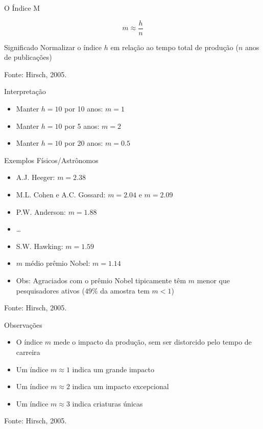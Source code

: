 \documentclass{beamer}
\begin{document}
\begin{frame}{O Índice M}
  \begin{definition}
    \begin{displaymath}
      m \approx \frac{h}{n}
    \end{displaymath}
  \end{definition}
  \begin{block}{Significado}
    Normalizar o índice $h$ em relação ao tempo total de produção ($n$ anos de publicações)
  \end{block}

\vfill
Fonte: Hirsch, 2005.
\end{frame}

\begin{frame}{Interpretação}
  \begin{itemize}
  \item Manter $h=10$ por 10 anos: $m=1$
  \item Manter $h=10$ por 5 anos: $m=2$
  \item Manter $h=10$ por 20 anos: $m=0.5$
  \end{itemize}
\end{frame}

\begin{frame}{Exemplos Físicos/Astrônomos}
  \begin{itemize}
  \item<1-> A.J. Heeger: $m=2.38$
  \item<1-> M.L. Cohen e A.C. Gossard: $m=2.04$ e $m=2.09$
  \item<1-> P.W. Anderson: $m=1.88$
  \item<1-> \ldots
  \item<1-> S.W. Hawking: $m=1.59$
  \item<2-> $m$ médio prêmio Nobel: $m=1.14$
  \item<3-> Obs: Agraciados com o prêmio Nobel tipicamente têm $m$ menor que pesquisadores ativos ($49\%$ da amostra tem $m<1$)
  \end{itemize}

\vfill
Fonte: Hirsch, 2005.
\end{frame}

\begin{frame}{Observações}
  \begin{itemize}
  \item O índice $m$ mede o impacto da produção, sem ser distorcido pelo tempo de carreira
  \item Um índice $m\approx 1$ indica um grande impacto
  \item Um índice $m\approx 2$ indica um impacto excepcional
  \item Um índice $m\approx 3$ indica criaturas únicas
  \end{itemize}

\vfill
Fonte: Hirsch, 2005.
\end{frame}
\end{document}
